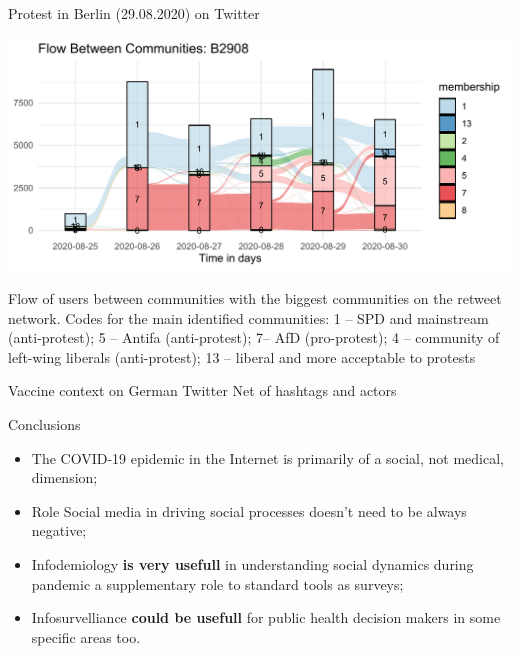 \documentclass[
  10pt,
  ignorenonframetext,
  a4paper,handout]{beamer}
\begin{document}
\begin{frame}{Protest in Berlin (29.08.2020) on Twitter}
\protect\hypertarget{protest-in-berlin-29.08.2020-on-twitter}{}
\begin{center}\includegraphics[width=0.95\linewidth]{b29_flow_} \end{center}

Flow of users between communities with the biggest communities on the
retweet network. Codes for the main identified communities: 1 -- SPD and
mainstream (anti-protest); 5 -- Antifa (anti-protest); 7-- AfD
(pro-protest); 4 -- community of left-wing liberals (anti-protest); 13
-- liberal and more acceptable to protests
\end{frame}

\begin{frame}{Vaccine context on German Twitter}
\protect\hypertarget{vaccine-context-on-german-twitter}{}
Net of hashtags and actors
\end{frame}

\begin{frame}{Conclusions}
\protect\hypertarget{conclusions}{}
\begin{itemize}
\item
  The COVID-19 epidemic in the Internet is primarily of a social, not
  medical, dimension;
\item
  Role Social media in driving social processes doesn't need to be
  always negative;
\item
  Infodemiology \textbf{is very usefull} in understanding social
  dynamics during pandemic a supplementary role to standard tools as
  surveys;
\item
  Infosurvelliance \textbf{could be usefull} for public health decision
  makers in some specific areas too.
\end{itemize}
\end{frame}
\end{document}

